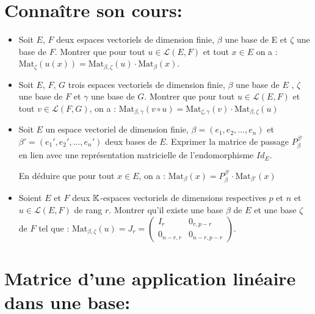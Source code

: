 \documentclass[a4paper,11pt]{article}
\theoremstyle{definition}
\begin{document}
 
	

\noindent{}

\smallskip
\section*{Connaître son cours:}
\begin{itemize}[$\bullet$]
	\item Soit $E$, $F$ deux espaces vectoriels de dimension finie, $\beta$ une base de E et $\zeta$ une base de $F$. Montrer que pour tout $u \in \mathcal{L} (E , F )$ et tout $x \in E$ on a : $\text{Mat}_\zeta (u (x )) = \text{Mat}_{\beta,\zeta}(u) \cdot \text{Mat}_\beta(x )$.
	\item Soit $E $, $F $, $G$ trois espaces vectoriels de dimension finie, $\beta$ une base de $E$ , $\zeta$ une base de $F$ et $\gamma$
	une base de $G $. Montrer que pour tout $u \in \mathcal{L} (E , F )$ et tout $v \in \mathcal{L} (F , G )$, on a : $\text{Mat}_{\beta, \gamma} (v\circ u ) = \text{Mat}_{\zeta, \gamma} (v ) \cdot \text{Mat}_{\beta, \zeta} ( u )$
	\item Soit $E$ un espace vectoriel de dimension finie, $\beta =(e_1,e_2,\dots,e_n)$ et $\beta'=(e_1',e_2',\dots,e_n')$ deux bases de $E $. Exprimer la matrice de passage $P_\beta^{\beta'}$ en lien avec une représentation matricielle de l'endomorphisme $Id_E$.
	
	En déduire que pour tout $x \in E $, on a : $\text{Mat}_\beta (x ) = P_\beta^{\beta'} \cdot \text{Mat}_{\beta'}(x )$
	\item Soient $E$ et $F$ deux $\mathbb{K}$-espaces vectoriels de dimensions respectives $p$ et $n$ et $u \in\mathcal L (E, F )$ de rang $r$.  Montrer qu'il existe une base $\beta$ de $E$ et une base $\zeta$ de $F$ tel que : $\text{Mat}_{\beta,\zeta}(u) = J_r = \begin{pmatrix}
	I_r & 0_{r,p-r} \\
	0_{n-r,r} & 0_{n-r,p-r}
	\end{pmatrix}$. 

\end{itemize}
\raggedright

\section*{Matrice d’une application linéaire dans une base:}\hfill\\%
\end{document}
